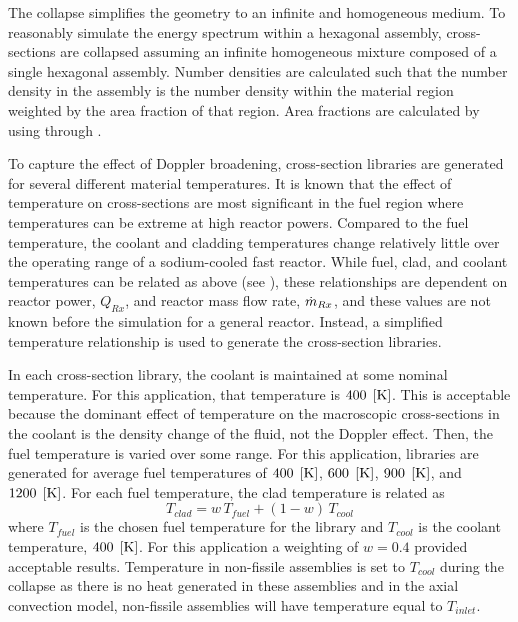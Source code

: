     The collapse simplifies the geometry to an infinite and homogeneous medium.
    To reasonably simulate the energy spectrum within a hexagonal assembly,
    cross-sections are collapsed assuming an infinite homogeneous mixture 
    composed of a single hexagonal assembly. Number densities are calculated 
    such that the number density in the assembly is the number density within
    the material region weighted by the area fraction of that region. Area
    fractions are calculated by using  through 
    .
    
    To capture the effect of Doppler broadening, cross-section libraries are
    generated for several different material temperatures.
    It is known that the effect of temperature on cross-sections are most
    significant in the fuel region where temperatures can be extreme at high
    reactor powers. Compared to the fuel temperature, the coolant and cladding
    temperatures change relatively little over the operating range of a
    sodium-cooled fast reactor.
    While fuel, clad, and coolant temperatures can be related as above (see
    ), these
    relationships are dependent on reactor power, $Q_{Rx}$, and reactor mass 
    flow rate, $\dot{m}_{Rx}$, and these values are not known before the
    simulation for a general reactor. Instead, a simplified temperature 
    relationship is used to generate the cross-section libraries.

    In each cross-section library, the coolant is maintained at some nominal
    temperature. For this application, that temperature is $400 \;\left[\text{{K}}\right]$. This
    is acceptable because the dominant effect of temperature on the macroscopic
    cross-sections in the coolant is the density change of the fluid, not the
    Doppler effect. Then, the fuel temperature is varied over some range. For
    this application, libraries are generated for average fuel temperatures of 
    $400 \;\left[\text{{K}}\right]$, $600 \;\left[\text{{K}}\right]$, $900 \;\left[\text{{K}}\right]$, and $1200 \;\left[\text{{K}}\right]$. For
    each fuel temperature, the clad temperature is related as 
    \begin{equation}
      T_{clad} = w \, T_{fuel} + (1-w) \, T_{cool}
    \end{equation}
    where $T_{fuel}$ is the chosen fuel temperature for the library and
    $T_{cool}$ is the coolant temperature, $400 \;\left[\text{{K}}\right]$. For this application
    a weighting of $w=0.4$ provided acceptable results. Temperature in
    non-fissile assemblies is set to $T_{cool}$ during the collapse as there is
    no heat generated in these assemblies and in the axial convection model,
    non-fissile assemblies will have temperature equal to $T_{inlet}$.


